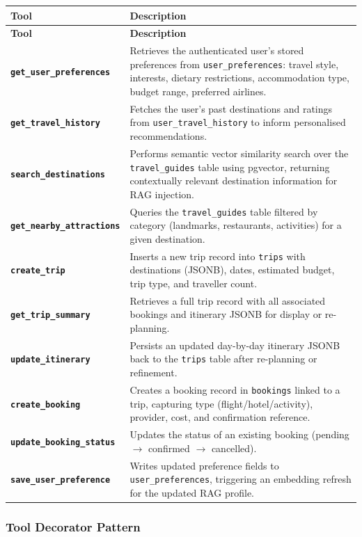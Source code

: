 \documentclass[12pt, a4paper]{article}
\newcommand{\tool}[1]{\texttt{\textbf{#1}}}
\begin{document}
\begin{longtable}{|p{4.2cm}|p{9.5cm}|}
  \hline
  \textbf{Tool} & \textbf{Description} \\
  \hline
  \endfirsthead
  \hline
  \textbf{Tool} & \textbf{Description} \\
  \hline
  \endhead
  \tool{get\_user\_preferences} & Retrieves the authenticated user's stored preferences from \texttt{user\_preferences}: travel style, interests, dietary restrictions, accommodation type, budget range, preferred airlines. \\
  \hline
  \tool{get\_travel\_history} & Fetches the user's past destinations and ratings from \texttt{user\_travel\_history} to inform personalised recommendations. \\
  \hline
  \tool{search\_destinations} & Performs semantic vector similarity search over the \texttt{travel\_guides} table using pgvector, returning contextually relevant destination information for RAG injection. \\
  \hline
  \tool{get\_nearby\_attractions} & Queries the \texttt{travel\_guides} table filtered by category (landmarks, restaurants, activities) for a given destination. \\
  \hline
  \tool{create\_trip} & Inserts a new trip record into \texttt{trips} with destinations (JSONB), dates, estimated budget, trip type, and traveller count. \\
  \hline
  \tool{get\_trip\_summary} & Retrieves a full trip record with all associated bookings and itinerary JSONB for display or re-planning. \\
  \hline
  \tool{update\_itinerary} & Persists an updated day-by-day itinerary JSONB back to the \texttt{trips} table after re-planning or refinement. \\
  \hline
  \tool{create\_booking} & Creates a booking record in \texttt{bookings} linked to a trip, capturing type (flight/hotel/activity), provider, cost, and confirmation reference. \\
  \hline
  \tool{update\_booking\_status} & Updates the status of an existing booking (pending $\to$ confirmed $\to$ cancelled). \\
  \hline
  \tool{save\_user\_preference} & Writes updated preference fields to \texttt{user\_preferences}, triggering an embedding refresh for the updated RAG profile. \\
  \hline
\end{longtable}

\subsubsection{Tool Decorator Pattern}
\end{document}

